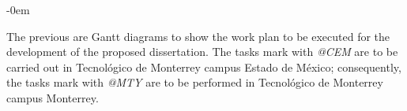 \begin{gantt}{11}{12}
\begin{ganttitle}
\end{ganttitle}

\begin{ganttitle}
\end{ganttitle}



\end{gantt}

\leftskip-0em
\newpage 

The previous are Gantt diagrams to show the work plan to be executed for the development of the proposed dissertation. The tasks mark with \emph{@CEM} are to be carried out in Tecnológico de Monterrey campus Estado de México; consequently, the tasks mark with \emph{@MTY} are to be performed in Tecnológico de Monterrey campus Monterrey.







